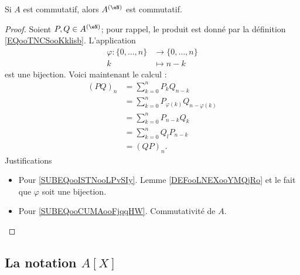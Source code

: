 \begin{lemma}       \label{LEMooWVUXooQlaepO}
    Si \( A\) est commutatif, alors \( A^{(\eN)}\) est commutatif.
\end{lemma}

\begin{proof}
    Soient \( P,Q\in A^{(\eN)}\); pour rappel, le produit est donné par la définition \ref{EQooTNCSooKklisb}. L'application
    \begin{equation}
        \begin{aligned}
            \varphi\colon \{ 0,\ldots, n \}&\to \{ 0,\ldots, n \} \\
            k&\mapsto n-k 
        \end{aligned}
    \end{equation}
    est une bijection. Voici maintenant le calcul :
    \begin{subequations}
        \begin{align}
            (PQ)_n&=\sum_{k=0}^nP_kQ_{n-k}\\
            &=\sum_{k=0}^nP_{\varphi(k)}Q_{n-\varphi(k)}    \label{SUBEQooISTNooLPvSIy} \\
            &=\sum_{k=0}^nP_{n-k}Q_{k}\\
            &=\sum_{k=0}^nQ_lP_{n-k}      \label{SUBEQooCUMAooFjqqHW}\\
            &=(QP)_n.
        \end{align}
    \end{subequations}
    Justifications
    \begin{itemize}
        \item Pour \eqref{SUBEQooISTNooLPvSIy}. Lemme \ref{DEFooLNEXooYMQjRo} et le fait que \( \varphi\) soit une bijection.
        \item Pour \eqref{SUBEQooCUMAooFjqqHW}. Commutativité de \( A\).
    \end{itemize}
\end{proof}


\subsection{La notation \texorpdfstring{$ A[X]$}{A[X]}}
\label{SUBSECooLEKVooFBPSJz}

